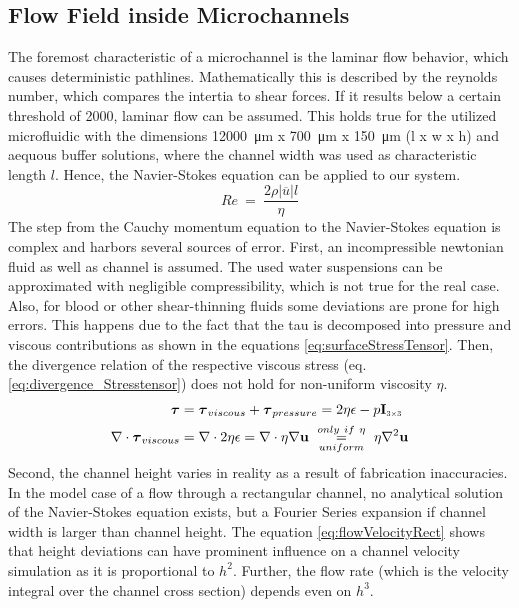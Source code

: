 \subsection{Flow Field inside Microchannels}
The foremost characteristic of a microchannel is the laminar flow behavior, which causes deterministic pathlines. Mathematically this is described by the reynolds number, which compares the intertia to shear forces. If it results below a certain threshold of 2000, laminar flow can be assumed. This holds true for the utilized microfluidic with the dimensions \SI{12000}{\micro\meter} x \SI{700}{\micro\meter} x \SI{150}{\micro\meter} (l x w x h) and aequous buffer solutions, where the channel width was used as characteristic length $l$. Hence, the Navier-Stokes equation can be applied to our system. 
\begin{equation}
	\mathit{Re}\ =\ \frac{2 \rho |\overline{u}| l }{\eta}
\end{equation}
The step from the Cauchy momentum equation to the Navier-Stokes equation is complex and harbors several sources of error. First, an incompressible newtonian fluid as well as channel is assumed. The used water suspensions can be approximated with negligible compressibility, which is not true for the real case. Also, for blood or other shear-thinning fluids some deviations are prone for high errors. This happens due to the fact that the \acrfull{tau} is decomposed into pressure and viscous contributions as shown in the equations \ref{eq:surfaceStressTensor}. Then, the divergence relation  of the respective viscous stress (eq. \ref{eq:divergence_Stresstensor}) does not hold for non-uniform viscosity $\eta$.
\begin{align}
	\boldsymbol{\tau} &= \boldsymbol{\tau}_{viscous} +  \boldsymbol{\tau}_{pressure} = 2\eta\epsilon - p \mathbf{I}_{\scaleto{3 \times 3}{4pt}} \label{eq:surfaceStressTensor}\\
	\nabla \cdot \boldsymbol{\tau}_{viscous} &= \nabla \cdot 2\eta\epsilon = \nabla \cdot \eta \nabla \mathbf{u} \ \underset{uniform}{\overset{only \ if \ \eta}{=}} \ \eta \nabla^2 \mathbf{u} 	\label{eq:divergence_Stresstensor}
\end{align}
Second, the channel height varies in reality as a result of fabrication inaccuracies. In the model case of a flow through a rectangular channel, no analytical solution of the Navier-Stokes equation exists, but a Fourier Series expansion if channel width is larger than channel height. \cite{lit:fluidic:bruus} The equation \ref{eq:flowVelocityRect} shows that height deviations can have prominent influence on a channel velocity simulation as it is proportional to $h^2$. Further, the flow rate (which is the velocity integral over the channel cross section) depends even on $h^3$. 
